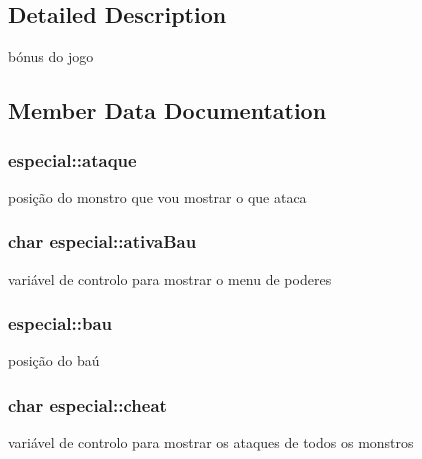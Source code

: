 \subsection{Detailed Description}
bónus do jogo 

\subsection{Member Data Documentation}
\subsubsection[{\texorpdfstring{ataque}{ataque}}]{ especial\+::ataque}\hypertarget{structespecial_a6a77206f06920d5c2bca72c6ed74ac90}{}\label{structespecial_a6a77206f06920d5c2bca72c6ed74ac90}
posição do monstro que vou mostrar o que ataca 
\subsubsection[{\texorpdfstring{ativa\+Bau}{ativaBau}}]{\setlength{\rightskip}{0pt plus 5cm}char especial\+::ativa\+Bau}\hypertarget{structespecial_ac67764954ed1ac6696403048870eba25}{}\label{structespecial_ac67764954ed1ac6696403048870eba25}
variável de controlo para mostrar o menu de poderes 
\subsubsection[{\texorpdfstring{bau}{bau}}]{ especial\+::bau}\hypertarget{structespecial_ad8054a7b690948458ec69411629ee0b3}{}\label{structespecial_ad8054a7b690948458ec69411629ee0b3}
posição do baú 
\subsubsection[{\texorpdfstring{cheat}{cheat}}]{\setlength{\rightskip}{0pt plus 5cm}char especial\+::cheat}\hypertarget{structespecial_a8c1a58b1321bb7a2c6eba4f4fa49fefe}{}\label{structespecial_a8c1a58b1321bb7a2c6eba4f4fa49fefe}
variável de controlo para mostrar os ataques de todos os monstros 
